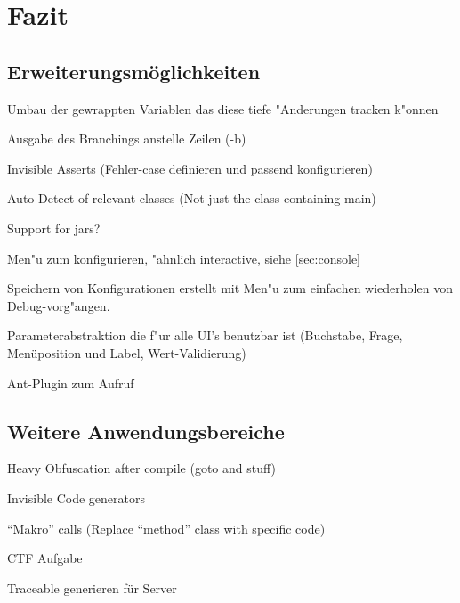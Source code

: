 
\chapter{Fazit}



\section{Erweiterungsmöglichkeiten} 

Umbau der gewrappten Variablen das diese tiefe "Anderungen tracken k"onnen

Ausgabe des Branchings anstelle Zeilen (-b)

Invisible Asserts (Fehler-case definieren und passend konfigurieren)

Auto-Detect of relevant classes (Not just the class containing main)

Support for jars?

Men"u zum konfigurieren, "ahnlich interactive, siehe \ref{sec:console}

Speichern von Konfigurationen erstellt mit Men"u zum einfachen wiederholen von Debug-vorg"angen.

Parameterabstraktion die f"ur alle UI's benutzbar ist (Buchstabe, Frage, Menüposition und Label, Wert-Validierung)

Ant-Plugin zum Aufruf

\section{Weitere Anwendungsbereiche} 

Heavy Obfuscation after compile (goto and stuff)

Invisible Code generators

"`Makro"' calls (Replace "`method"' class with specific code)

CTF Aufgabe

Traceable generieren für Server